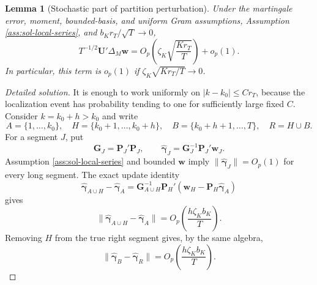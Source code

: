 \documentclass[12pt]{article}
\numberwithin{equation}{section}
\newtheorem{lemma}{Lemma}
\theoremstyle{definition}
\begin{document}
\begin{lemma}[Stochastic part of partition perturbation]
\label{lem:wb-bridge-u}
Under the martingale error, moment, bounded-basis, and uniform Gram
assumptions, Assumption \ref{ass:sol-local-series}, and
\(b_Kr_T/\sqrt T\to0\),
\[
    T^{-1/2}\bm U'\Delta_M\bm w
    =
    O_p\!\left(\zeta_K\sqrt{\frac{K r_T}{T}}\right)+o_p(1).
\]
In particular, this term is \(o_p(1)\) if \(\zeta_K\sqrt{K r_T/T}\to0\).
\end{lemma}


\begin{proof}[Detailed solution]
It is enough to work uniformly on
\(|k-k_0|\leq Cr_T\), because the localization event has probability tending
to one for sufficiently large fixed \(C\).  Consider \(k=k_0+h>k_0\) and
write
\[
    A=\{1,\ldots,k_0\},\quad
    H=\{k_0+1,\ldots,k_0+h\},\quad
    B=\{k_0+h+1,\ldots,T\},\quad R=H\cup B.
\]
For a segment \(J\), put
\[
    \bm G_J=\bm P_J'\bm P_J,
    \qquad
    \widehat{\bm\gamma}_J=\bm G_J^{-1}\bm P_J'\bm w_J.
\]
Assumption \ref{ass:sol-local-series} and bounded \(\bm w\) imply
\(\|\widehat{\bm\gamma}_J\|=O_p(1)\) for every long segment.  The exact update
identity
\[
    \widehat{\bm\gamma}_{A\cup H}-\widehat{\bm\gamma}_A
    =\bm G_{A\cup H}^{-1}
       \bm P_H'(\bm w_H-\bm P_H\widehat{\bm\gamma}_A)
\]
gives
\[
    \|\widehat{\bm\gamma}_{A\cup H}-
       \widehat{\bm\gamma}_A\|
    =O_p\left(\frac{h\zeta_Kb_K}{T}\right).
\]
Removing \(H\) from the true right segment gives, by the same algebra,
\[
    \|\widehat{\bm\gamma}_{B}-
       \widehat{\bm\gamma}_{R}\|
    =O_p\left(\frac{h\zeta_Kb_K}{T}\right).
\]


\end{proof}
\end{document}

